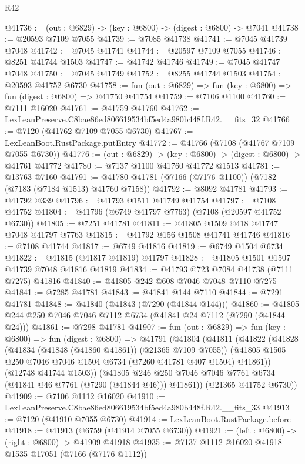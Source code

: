 \begin{lexlean}{R42}
\begin{coremodule}
{@41736 := (out : @6829) -> (key : @6800) -> (digest : @6800) -> @7041
@41738 := @20593 @7109 @7055
@41739 := @7085 @41738
@41741 := @7045 @41739 @7048
@41742 := @7045 @41741
@41744 := @20597 @7109 @7055
@41746 := @8251 @41744 @1503
@41747 := @41742 @41746
@41749 := @7045 @41747 @7048
@41750 := @7045 @41749
@41752 := @8255 @41744 @1503
@41754 := @20593 @41752 @6730
@41758 := fun (out : @6829) => fun (key : @6800) => fun (digest : @6800) => @41750 @41754
@41759 := @7106 @1100
@41760 := @7111 @16020
@41761 := @41759 @41760
@41762 := LexLeanPreserve.C8bae86ed806619534bf5ed4a980b448f.R42.__fits_32
@41766 := @7120 (@41762 @7109 @7055 @6730)
@41767 := LexLeanBoot.RustPackage.putEntry
@41772 := @41766 (@7108 (@41767 @7109 @7055 @6730))
@41776 := (out : @6829) -> (key : @6800) -> (digest : @6800) -> @41761 @41772
@41780 := @7137 @1100 @41760 @41772 @1513
@41781 := @13763 @7160
@41791 := @41780 @41781 (@7166 (@7176 @1100)) (@7182 (@7183 (@7184 @1513) @41760 @7158))
@41792 := @8092 @41781
@41793 := @41792 @339
@41796 := @41793 @1511 @41749 @41754
@41797 := @7108 @41752
@41804 := @41796 (@6749 @41797 @7763) (@7108 (@20597 @41752 @6730))
@41805 := @7251 @41781
@41811 := @41805 @1509 @418 @41747 @7048 @41797 @7763
@41815 := @41792 @156 @1508 @41741 @41746
@41816 := @7108 @41744
@41817 := @6749 @41816
@41819 := @6749 @1504 @6734
@41822 := @41815 (@41817 @41819) @41797
@41828 := @41805 @1501 @1507 @41739 @7048 @41816 @41819
@41834 := @41793 @723 @7084 @41738 (@7111 @7275) @41816
@41840 := @41805 @242 @608 @7046 @7048 @7110 @7275
@41841 := @7285 @41781
@41843 := @41841 @144 @7110
@41844 := @7291 @41781
@41848 := @41840 (@41843 (@7290 (@41844 @144)))
@41860 := @41805 @244 @250 @7046 @7046 @7112 @6734 (@41841 @24 @7112 (@7290 (@41844 @24)))
@41861 := @7298 @41781
@41907 := fun (out : @6829) =>
  fun (key : @6800) =>
  fun (digest : @6800) =>
  @41791
    (@41804
      (@41811
        (@41822
          (@41828
            (@41834 (@41848 (@41860 @41861)) (@21365 @7109 @7055))
            (@41805 @1505 @250 @7046 @7046 @1504 @6734 (@7260 @41781 @407 @1504) @41861))
          (@12748 @41744 @1503))
        (@41805 @246 @250 @7046 @7046 @7761 @6734 (@41841 @46 @7761 (@7290 (@41844 @46))) @41861))
      (@21365 @41752 @6730))
@41909 := @7106 @1112 @16020
@41910 := LexLeanPreserve.C8bae86ed806619534bf5ed4a980b448f.R42.__fits_33
@41913 := @7120 (@41910 @7055 @6730)
@41914 := LexLeanBoot.RustPackage.before
@41918 := @41913 (@6759 (@41914 @7055 @6730))
@41921 := (left : @6800) -> (right : @6800) -> @41909 @41918
@41935 := @7137
    @1112
    @16020
    @41918
    @1535
    @17051
    (@7166 (@7176 @1112))
}
\end{coremodule}
\end{lexlean}
